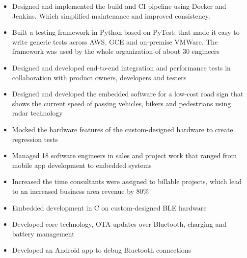 \documentclass{cv_doc}
\begin{document}

\begin{itemize}[label={\tiny\raisebox{1ex}{\textbullet}}]
  \item {Designed and implemented the build and CI pipeline using Docker and Jenkins. Which simplified maintenance and improved consistency.}
  \item {Built a testing framework in Python based on PyTest; that made it easy
  to write generic tests across AWS, GCE and on-premise VMWare. The framework
  was used by the whole organization of about 30 engineers}
  \item {Designed and developed end-to-end integration and performance tests in collaboration with product owners, developers and testers}
\end{itemize}


\begin{itemize}[label={\tiny\raisebox{1ex}{\textbullet}}]
  \item {Designed and developed the embedded software for a low-cost road sign
  that shows the current speed of passing vehicles, bikers and pedestrians
  using radar technology}
  \item {Mocked the hardware features of the custom-designed hardware to create
  regression tests}
\end{itemize}


\begin{itemize}[label={\tiny\raisebox{1ex}{\textbullet}}]
  \item {Managed 18 software engineers in sales and project work that ranged
  from mobile app development to embedded systems}
  \item {Increased the time consultants were assigned to billable projects,
  which lead to an increased business area revenue by 80\%}
\end{itemize}


\begin{itemize}[label={\tiny\raisebox{1ex}{\textbullet}}]
  \item {Embedded development in C on custom-designed BLE hardware}
  \item {Developed core technology, OTA updates over Bluetooth, charging
  and battery management}
  \item {Developed an Android app to debug Bluetooth connections}
\end{itemize}
\end{document}
